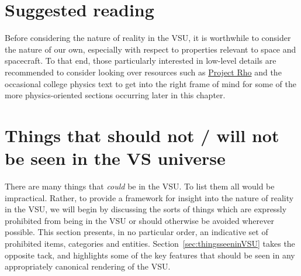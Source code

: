 \label{chapt:VSUreality}
\section{Suggested reading}
Before considering the nature of reality in the VSU, it is worthwhile
to consider the nature of our own, especially with respect to
properties relevant to space and spacecraft. To that end, those
particularly interested in low-level details are recommended to
consider looking over resources such as
\href{http://www.projectrho.com}{Project Rho} and the
occasional college physics text to get into the right frame of mind
for some of the more physics-oriented sections occurring later in this chapter.

\section{Things that should not / will not be seen in the VS universe}
\label{sec:thingsnotinVSU}
There are many things that {\it could} be in the VSU. To list them all
would be impractical. Rather, to provide a framework for insight into
the nature of reality in the VSU, we will begin by discussing the
sorts of things which are expressly prohibited from being in the VSU
or should otherwise be avoided wherever possible. This section
presents, in no particular order, an indicative set of prohibited
items, categories and entities. Section~\ref{sec:thingsseeninVSU}
takes the opposite tack, and highlights some of the key features that
should be seen in any appropriately canonical rendering of the VSU.

